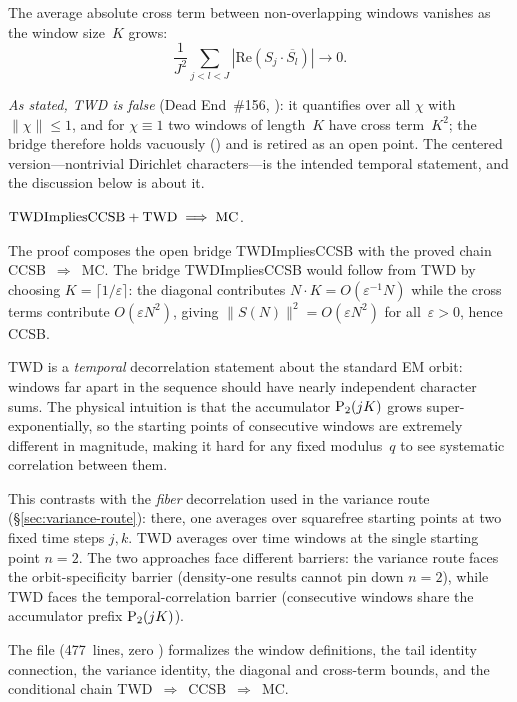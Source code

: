 \begin{property}
The average absolute cross term between non-overlapping windows
vanishes as the window size~$K$ grows:
\[
  \frac{1}{J^2} \sum_{j < l < J}
  |\mathrm{Re}(S_j \cdot \overline{S_l})| \to 0.
\]
\end{property}

\noindent\emph{As stated, TWD is false} (Dead End~\#156,
):
it quantifies over all $\chi$ with $\|\chi\| \le 1$, and for
$\chi \equiv 1$ two windows of length~$K$ have cross term~$K^2$; the
bridge  therefore holds vacuously
() and is retired as an open point.  The
centered version---nontrivial Dirichlet characters---is the intended
temporal statement, and the discussion below is about it.

\begin{theorem}
$\mathrm{TWDImpliesCCSB} + \mathrm{TWD}
\;\Longrightarrow\; \mathrm{MC}$.
\end{theorem}

\noindent The proof composes the open bridge TWDImpliesCCSB with the
proved chain CCSB~$\Rightarrow$~MC\@.  The bridge TWDImpliesCCSB
would follow from TWD by choosing $K = \lceil 1/\varepsilon\rceil$:
the diagonal contributes $N \cdot K = O(\varepsilon^{-1} N)$ while the
cross terms contribute $O(\varepsilon N^2)$, giving
$\|S(N)\|^2 = O(\varepsilon N^2)$ for all~$\varepsilon > 0$, hence CCSB\@.

\begin{remark}
\label{rem:twd-vs-ensemble}
TWD is a \emph{temporal} decorrelation statement about the standard EM
orbit: windows far apart in the sequence should have nearly
independent character sums.  The physical intuition is that the
accumulator $\mathrm{P}_{2}(jK)$ grows super-exponentially, so the starting
points of consecutive windows are extremely different in magnitude,
making it hard for any fixed modulus~$q$ to see systematic correlation
between them.

This contrasts with the \emph{fiber} decorrelation used in the
variance route (\S\ref{sec:variance-route}): there, one averages over
squarefree starting points at two fixed time steps $j, k$.  TWD
averages over time windows at the single starting point $n = 2$.  The
two approaches face different barriers: the variance route faces the
orbit-specificity barrier (density-one results cannot pin down $n=2$),
while TWD faces the temporal-correlation barrier (consecutive windows
share the accumulator prefix $\mathrm{P}_{2}(jK)$).

The file  (477~lines, zero
) formalizes the window definitions, the tail identity
connection, the variance identity, the diagonal and cross-term bounds,
and the conditional chain TWD~$\Rightarrow$~CCSB~$\Rightarrow$~MC\@.
\end{remark}
